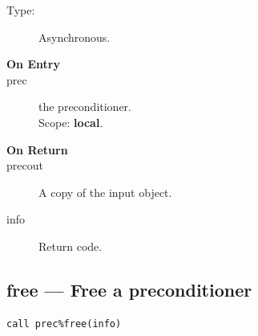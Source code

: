 \begin{description}
\item[Type:] Asynchronous.
\item[\bf On Entry]
\item[prec] the preconditioner.\\
Scope: {\bf local}.\\
\end{description}

\begin{description}
\item[\bf On Return]
\item[precout] A copy of the input object.
\item[info] Return code. 
\end{description}


\clearpage\subsection{free --- Free a  preconditioner}

\begin{verbatim}
call prec%free(info)
\end{verbatim}

